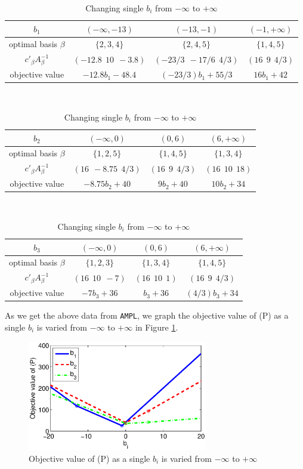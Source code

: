 \begin{table}[!h]
\centering
\small
\begin{tabular}{|c|c|c|c|}\hline

$b_1$ & $(-\infty, -13)$ & $(-13, -1)$ & $(-1,+\infty)$ \\\hline
optimal basis $\beta$ & $\{2,3,4\}$ & $\{2,4,5\}$ & $\{1,4,5\}$ \\\hline
$c'_{\beta}A^{-1}_{\beta}$ & $(-12.8~~10~~-3.8)$ & $(-23/3~~-17/6~~4/3)$ & $(16~~9~~4/3)$ \\\hline
objective value & $-12.8b_1-48.4$& $(-23/3)b_1+55/3$ & $16b_1+42$ \\\hline 

\end{tabular}
\\
\begin{tabular}{|c|c|c|c|}\hline

$b_2$ & $(-\infty, 0)$ & $(0, 6)$ & $(6,+\infty)$ \\\hline
optimal basis $\beta$ & $\{1,2,5\}$ & $\{1,4,5\}$ & $\{1,3,4\}$ \\\hline
$c'_{\beta}A^{-1}_{\beta}$ & $(16~~-8.75~~4/3)$ & $(16~~9~~4/3)$ & $(16~~10~~18)$ \\\hline
objective value & $-8.75b_2+40$& $9b_2+40$ & $10b_2+34$ \\\hline 

\end{tabular}
\\
\begin{tabular}{|c|c|c|c|}\hline

$b_3$ & $(-\infty, 0)$ & $(0, 6)$ & $(6,+\infty)$ \\\hline
optimal basis $\beta$ & $\{1,2,3\}$ & $\{1,3,4\}$ & $\{1,4,5\}$ \\\hline
$c'_{\beta}A^{-1}_{\beta}$ & $(16~~10~~-7)$ & $(16~~10~~1)$ & $(16~~9~~4/3)$ \\\hline
objective value & $-7b_3+36$& $b_3+36$ & $(4/3)b_3+34$ \\\hline 

\end{tabular}
\caption{Changing single $b_i$ from $-\infty$ to $+\infty$}
\label{tab:vector-cost}
\end{table}

As we get the above data from {\tt AMPL}, we graph the objective value of (P) as a single $b_i$ is varied from $-\infty$ to $+\infty$ in Figure \ref{fig:p2}.

\begin{figure}[h!!]
\includegraphics[width=0.7\textwidth]{p2/p2.eps}
\caption{Objective value of (P) as a single $b_i$ is varied from $-\infty$ to $+\infty$}\label{fig:p2}
\end{figure}